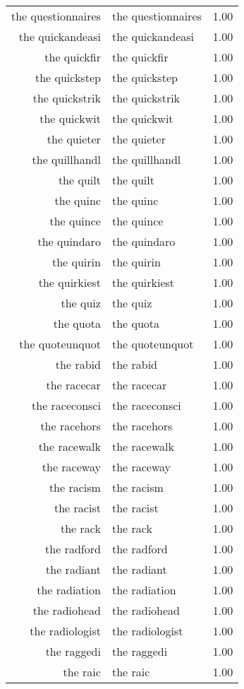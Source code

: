 \begin{table}[ht]
\begin{tabular}{rlr}
  the questionnaires & the questionnaires & 1.00 \\ 
  the quickandeasi & the quickandeasi & 1.00 \\ 
  the quickfir & the quickfir & 1.00 \\ 
  the quickstep & the quickstep & 1.00 \\ 
  the quickstrik & the quickstrik & 1.00 \\ 
  the quickwit & the quickwit & 1.00 \\ 
  the quieter & the quieter & 1.00 \\ 
  the quillhandl & the quillhandl & 1.00 \\ 
  the quilt & the quilt & 1.00 \\ 
  the quinc & the quinc & 1.00 \\ 
  the quince & the quince & 1.00 \\ 
  the quindaro & the quindaro & 1.00 \\ 
  the quirin & the quirin & 1.00 \\ 
  the quirkiest & the quirkiest & 1.00 \\ 
  the quiz & the quiz & 1.00 \\ 
  the quota & the quota & 1.00 \\ 
  the quoteunquot & the quoteunquot & 1.00 \\ 
  the rabid & the rabid & 1.00 \\ 
  the racecar & the racecar & 1.00 \\ 
  the raceconsci & the raceconsci & 1.00 \\ 
  the racehors & the racehors & 1.00 \\ 
  the racewalk & the racewalk & 1.00 \\ 
  the raceway & the raceway & 1.00 \\ 
  the racism & the racism & 1.00 \\ 
  the racist & the racist & 1.00 \\ 
  the rack & the rack & 1.00 \\ 
  the radford & the radford & 1.00 \\ 
  the radiant & the radiant & 1.00 \\ 
  the radiation & the radiation & 1.00 \\ 
  the radiohead & the radiohead & 1.00 \\ 
  the radiologist & the radiologist & 1.00 \\ 
  the raggedi & the raggedi & 1.00 \\ 
  the raic & the raic & 1.00 \\ 

\end{tabular}
\end{table}
